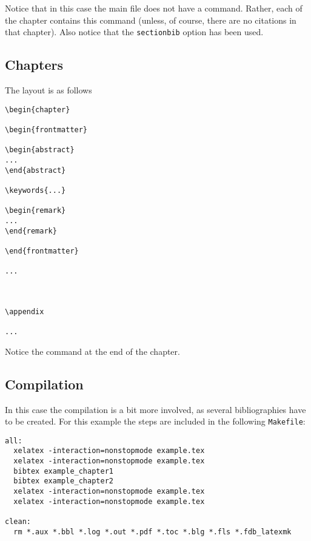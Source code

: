 Notice that in this case the main file does not have a \verb|| command. Rather, each of the chapter contains this command (unless, of course, there are no citations in that chapter). Also notice that the \verb|sectionbib| option has been used.

\subsection{Chapters}

The layout is as follows
\begin{mdframed}
\begin{verbatim}
\begin{chapter}

\begin{frontmatter}

\begin{abstract}
...
\end{abstract}

\keywords{...}

\begin{remark}
...
\end{remark}

\end{frontmatter}

...



\appendix

...

\end{verbatim}
\end{mdframed}

Notice the \verb|| command at the end of the chapter.

\subsection{Compilation}

In this case the compilation is a bit more involved, as several bibliographies have to be created. For this example the steps are included in the following \texttt{Makefile}:

\begin{mdframed}
\begin{verbatim}
all:
  xelatex -interaction=nonstopmode example.tex
  xelatex -interaction=nonstopmode example.tex
  bibtex example_chapter1
  bibtex example_chapter2
  xelatex -interaction=nonstopmode example.tex
  xelatex -interaction=nonstopmode example.tex

clean:
  rm *.aux *.bbl *.log *.out *.pdf *.toc *.blg *.fls *.fdb_latexmk
\end{verbatim}
\end{mdframed}

